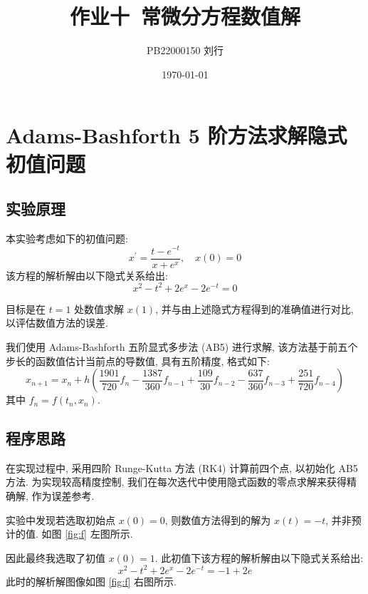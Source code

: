 \documentclass[12pt]{article}
\title{作业十~常微分方程数值解}
\author{PB22000150 刘行}
\date{\today}
\begin{document}
\maketitle

	\section{Adams-Bashforth 5 阶方法求解隐式初值问题}
		\subsection{实验原理}
			本实验考虑如下的初值问题:
			\begin{equation}
				x^{\prime} = \frac{t - e^{-t}}{x + e^{x}}, \quad x\left(0\right) = 0
			\end{equation}
			该方程的解析解由以下隐式关系给出:
			\begin{equation}
				x^{2} - t^{2} + 2e^{x} - 2e^{-t} = 0
			\end{equation}

			目标是在 $t = 1$ 处数值求解 $x\left(1\right)$, 并与由上述隐式方程得到的准确值进行对比, 以评估数值方法的误差.

			我们使用 Adams-Bashforth 五阶显式多步法 (AB5) 进行求解, 该方法基于前五个步长的函数值估计当前点的导数值, 具有五阶精度, 格式如下:
			\begin{equation}
				x_{n+1} = x_{n} + h\left(\frac{1901}{720}f_{n} - \frac{1387}{360}f_{n-1} + \frac{109}{30}f_{n-2} - \frac{637}{360}f_{n-3} + \frac{251}{720}f_{n-4}\right)
			\end{equation}
			其中 $f_{n} = f\left(t_{n}, x_{n}\right)$.

		\subsection{程序思路}
			在实现过程中, 采用四阶 Runge-Kutta 方法 (RK4) 计算前四个点, 以初始化 AB5 方法. 为实现较高精度控制, 我们在每次迭代中使用隐式函数的零点求解来获得精确解, 作为误差参考.

			实验中发现若选取初始点 $x\left(0\right)=0$, 则数值方法得到的解为 $x\left(t\right) = -t$, 并非预计的值. 如图 \ref{fig:f} 左图所示.
			
			因此最终我选取了初值 $x\left(0\right)=1$. 此初值下该方程的解析解由以下隐式关系给出:
			\begin{equation}
				x^2 - t^2 + 2e^x - 2e^{-t} = -1 + 2e
			\end{equation}
			此时的解析解图像如图 \ref{fig:f} 右图所示.
\end{document}
